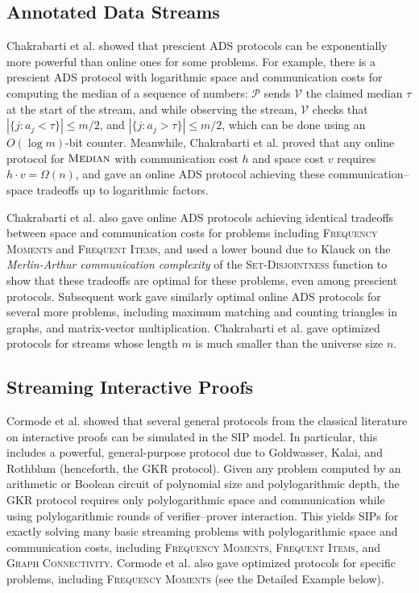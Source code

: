 \documentclass[11pt, letterpaper]{article}
\newcommand{\length}{m}
\newcommand{\cV}{\mathcal{V}}
\newcommand{\cP}{\mathcal{P}}
\begin{document}
\subsection{Annotated Data Streams}
\label{sec:ads}
Chakrabarti et al. \cite{icalp} showed that prescient ADS protocols can be exponentially more powerful than online ones for some problems. 
For example, there is a prescient ADS protocol with logarithmic space and communication costs for computing the median of a sequence of numbers: $\cP$ sends $\cV$ the claimed median $\tau$ at the start of the stream, and while observing the stream, $\cV$ checks that $|\{j:a_j < \tau\}| \leq \length/2$, and $|\{j:a_j > \tau\}| \leq \length/2$, which can be done using an $O(\log m)$-bit counter. Meanwhile, Chakrabarti et al. \cite{icalp} proved that any online protocol for $\textsc{Median}$ with communication
cost $h$ and space cost $v$ requires $h \cdot v = \Omega(n)$, and gave an online ADS protocol achieving these communication--space tradeoffs up to logarithmic factors.

Chakrabarti et al. \cite{icalp} also gave online ADS protocols achieving identical tradeoffs between space and communication costs for problems including \textsc{Frequency Moments} and \textsc{Frequent Items}, and used a lower bound  due to Klauck \cite{Klauck03} on the \emph{Merlin-Arthur communication complexity} of the \textsc{Set-Disjointness} function to show that these tradeoffs are optimal for these problems, even among prescient protocols. 
Subsequent work \cite{esa, semistreaming} gave similarly optimal online ADS protocols for several more problems, including maximum matching and counting triangles in graphs, and matrix-vector multiplication. Chakrabarti et al. \cite{soda} gave optimized protocols for streams whose
length $\length$ is much smaller than the universe size $n$.



\subsection{Streaming Interactive Proofs}
Cormode et al. \cite{vldb} showed that several general protocols from the classical literature on interactive proofs can be simulated in the SIP model. 
In particular, this includes a
powerful, general-purpose protocol due to Goldwasser, Kalai, and Rothblum \cite{gkr} (henceforth, the GKR protocol). Given any problem 
computed by an arithmetic or Boolean circuit of polynomial size and polylogarithmic depth,
the GKR protocol requires only polylogarithmic space and communication while using polylogarithmic
rounds of verifier--prover interaction. This yields SIPs for exactly solving many basic streaming problems with
polylogarithmic space and communication costs, including \textsc{Frequency Moments}, \textsc{Frequent Items}, and \textsc{Graph Connectivity}.
Cormode et al. \cite{vldb} also gave optimized protocols for specific problems, including \textsc{Frequency Moments} (see the Detailed Example below).
\end{document}
